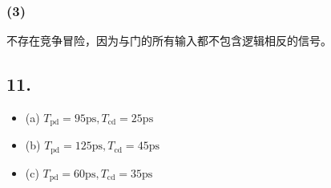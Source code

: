 \documentclass[12pt, a4paper]{ctexart}
\begin{document}
\subsubsection*{(3)}

不存在竞争冒险，因为与门的所有输入都不包含逻辑相反的信号。

\subsection*{11.}

\begin{itemize}
    \item (a) $T_{\text{pd}}=95\text{ps},T_{\text{cd}}=25\text{ps}$
    \item (b) $T_{\text{pd}}=125\text{ps},T_{\text{cd}}=45\text{ps}$
    \item (c) $T_{\text{pd}}=60\text{ps},T_{\text{cd}}=35\text{ps}$
\end{itemize}
\end{document}
